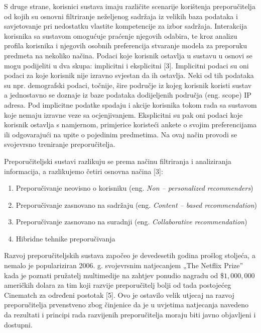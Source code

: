 \documentclass[times, utf8, diplomski]{fer}
\begin{document}
S druge strane, korisnici sustava imaju različite scenarije korištenja
preporučitelja od kojih su osnovni filtriranje neželjenog sadržaja iz velikih
baza podataka i savjetovanje pri nedostatku vlastite kompetencije za izbor sadržaja. 
Interakcija korisnika sa sustavom omogućuje praćenje njegovih odabira, te kroz analizu 
profila korisnika i njegovih osobnih preferencija stvaranje modela za preporuku predmeta 
na nekoliko načina. Podaci koje korisnik ostavlja u sustavu u osnovi se mogu podijeliti 
u dva skupa: implicitni i eksplicitni [3]. Implicitni podaci su oni podaci za koje korisnik nije 
izravno svjestan da ih ostavlja. 
Neki od tih podataka su npr. demografski podaci, točnije, šire područje iz kojeg korisnik koristi sustav a 
jednostavno se doznaje iz baze podataka dodijeljenih područja (eng. scope) IP adresa. 
Pod implicitne podatke spadaju i akcije korisnika tokom rada sa sustavom koje nemaju 
izravne veze sa ocjenjivanjem.
Eksplicitni su pak oni podaci koje korisnik ostavlja s namjernom, primjerice koristeći ankete o svojim 
preferencijama ili odgovarajući na upite o pojedinim predmetima. Na ovaj način provodi se svojevrsno 
treniranje preporučitelja.

Preporučiteljski sustavi razlikuju se prema načinu filtriranja i analiziranja informacija, 
a razlikujemo četiri osnovna načina [3]:
\begin{enumerate}
  \item Preporučivanje neovisno o korisniku (eng. \textit{Non -- personalized
  recommenders})
  \item Preporučivanje zasnovano na sadržaju (eng. \textit{Content -- based
  recommendation})
  \item Preporučivanje zasnovano na suradnji (eng. \textit{Collaborative
  recommendation})
  \item Hibridne tehnike preporučivanja
\end{enumerate}

Razvoj preporučiteljskih sustava započeo je devedesetih godina prošlog stoljeća,
a nemalo je populariziran 2006. g. svojevrsnim natjecanjem „The Netflix Prize” 
kada je poznati pružatelj multimedije na zahtjev ponudio nagradu od
\$$1,000,000$ američkih dolara za tim koji razvije preporučitelj bolji od tada
postojećeg \glqq Cinematch \grqq za određeni postotak [5].
Ovo je ostavilo velik utjecaj na razvoj preporučitelja prvenstveno zbog činjenice da je u uvjetima 
natjecanja navedeno da rezultati i principi rada razvijenih preporučitelja 
moraju biti javno objavljeni i dostupni.
\end{document}
